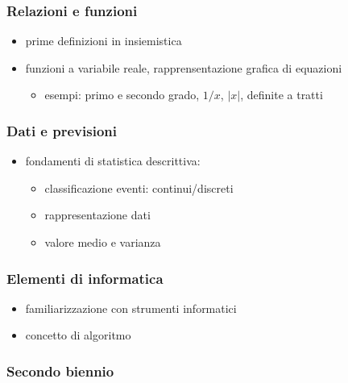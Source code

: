 \documentclass[letterpaper,10pt,english]{jupyterBook}
\begin{document}
\subsubsection*{Relazioni e funzioni}
\begin{itemize}
\item {} 
\sphinxAtStartPar
prime definizioni in insiemistica

\item {} 
\sphinxAtStartPar
funzioni a variabile reale, rapprensentazione grafica di equazioni
\begin{itemize}
\item {} 
\sphinxAtStartPar
esempi: primo e secondo grado, \(1/x\), \(|x|\), definite a tratti

\end{itemize}

\end{itemize}
\subsubsection*{Dati e previsioni}
\begin{itemize}
\item {} 
\sphinxAtStartPar
fondamenti di statistica descrittiva:
\begin{itemize}
\item {} 
\sphinxAtStartPar
classificazione eventi: continui/discreti

\item {} 
\sphinxAtStartPar
rappresentazione dati

\item {} 
\sphinxAtStartPar
valore medio e varianza

\end{itemize}

\end{itemize}
\subsubsection*{Elementi di informatica}
\begin{itemize}
\item {} 
\sphinxAtStartPar
familiarizzazione con strumenti informatici

\item {} 
\sphinxAtStartPar
concetto di algoritmo

\end{itemize}
\subsubsection*{Secondo biennio}
\end{document}
